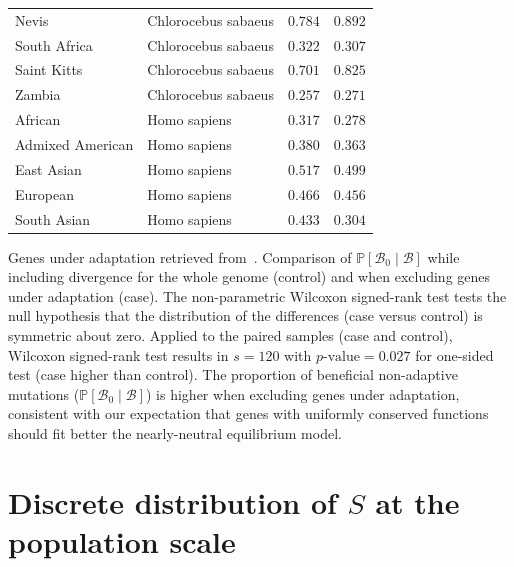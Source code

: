 \documentclass{article}
\newcommand{\proba}{\mathbb{P}}
\newcommand{\SphyBen}{\mathcal{B}_0}
\newcommand{\given}{\mid}
\newcommand{\Spop}{S}
\newcommand{\SpopBen}{\mathcal{B}}
\newcommand{\pvalue}{p\text{-value}}
\begin{document}
\begin{center}
\begin{tabular}{|l|l|r|r|}
            \rowcolor{LIGHTGREY} Nevis & Chlorocebus sabaeus & $ 0.784$ & $ 0.892$ \\
            \rowcolor{LIGHTGREY} South Africa & Chlorocebus sabaeus & $ 0.322$ & $ 0.307$ \\
            \rowcolor{LIGHTGREY} Saint Kitts & Chlorocebus sabaeus & $ 0.701$ & $ 0.825$ \\
            \rowcolor{LIGHTGREY} Zambia & Chlorocebus sabaeus & $ 0.257$ & $ 0.271$ \\
            African & Homo sapiens & $ 0.317$ & $ 0.278$ \\
            Admixed American & Homo sapiens & $ 0.380$ & $ 0.363$ \\
            East Asian & Homo sapiens & $ 0.517$ & $ 0.499$ \\
            European & Homo sapiens & $ 0.466$ & $ 0.456$ \\
            South Asian & Homo sapiens & $ 0.433$ & $ 0.304$ \\
            \bottomrule
        \end{tabular}
    \end{center}
    Genes under adaptation retrieved from~\cite{latrille_genes_2023}.
    Comparison of $\proba[\SphyBen\given \SpopBen ]$ while including divergence for the whole genome (control) and when excluding genes under adaptation (case).
    The non-parametric Wilcoxon signed-rank test tests the null hypothesis that the distribution of the differences (case versus control) is symmetric about zero.
    Applied to the paired samples (case and control), Wilcoxon signed-rank test results in $s=120$ with $\pvalue=0.027$ for one-sided test (case higher than control).
    The proportion of beneficial non-adaptive mutations ($\proba[\SphyBen\given \SpopBen ]$) is higher when excluding genes under adaptation, consistent with our expectation that genes with uniformly conserved functions should fit better the nearly-neutral equilibrium model.

    \newpage

    \section{Discrete distribution of $\Spop$ at the population scale}
\end{document}
